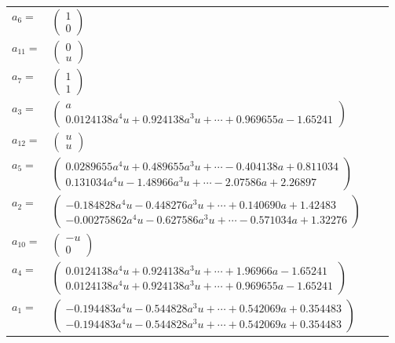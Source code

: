 \documentclass[1p]{elsarticle_modified}
\theoremstyle{definition}
\begin{document}
\begin{tabular}{m{7pt} m{180pt} m{7pt} m{180pt} }
\flushright $a_{6}=$&$\begin{pmatrix}1\\0\end{pmatrix}$ \\
\flushright $a_{11}=$&$\begin{pmatrix}0\\u\end{pmatrix}$ \\
\flushright $a_{7}=$&$\begin{pmatrix}1\\1\end{pmatrix}$ \\
\flushright $a_{3}=$&$\begin{pmatrix}a\\0.0124138 a^{4} u+0.924138 a^{3} u+\cdots+0.969655 a-1.65241\end{pmatrix}$ \\
\flushright $a_{12}=$&$\begin{pmatrix}u\\u\end{pmatrix}$ \\
\flushright $a_{5}=$&$\begin{pmatrix}0.0289655 a^{4} u+0.489655 a^{3} u+\cdots-0.404138 a+0.811034\\0.131034 a^{4} u-1.48966 a^{3} u+\cdots-2.07586 a+2.26897\end{pmatrix}$ \\
\flushright $a_{2}=$&$\begin{pmatrix}-0.184828 a^{4} u-0.448276 a^{3} u+\cdots+0.140690 a+1.42483\\-0.00275862 a^{4} u-0.627586 a^{3} u+\cdots-0.571034 a+1.32276\end{pmatrix}$ \\
\flushright $a_{10}=$&$\begin{pmatrix}- u\\0\end{pmatrix}$ \\
\flushright $a_{4}=$&$\begin{pmatrix}0.0124138 a^{4} u+0.924138 a^{3} u+\cdots+1.96966 a-1.65241\\0.0124138 a^{4} u+0.924138 a^{3} u+\cdots+0.969655 a-1.65241\end{pmatrix}$ \\
\flushright $a_{1}=$&$\begin{pmatrix}-0.194483 a^{4} u-0.544828 a^{3} u+\cdots+0.542069 a+0.354483\\-0.194483 a^{4} u-0.544828 a^{3} u+\cdots+0.542069 a+0.354483\end{pmatrix}$ \\

\end{tabular}
\end{document}
